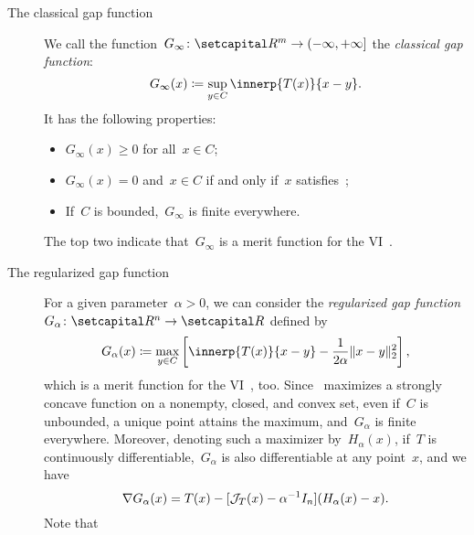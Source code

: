 \documentclass[../../main]{subfiles}
\begin{document}
\begin{example} 
    \begin{description}
        \item[The classical gap function~\cite{Auslender1976,Hearn1982}]
            We call the function~$G_\infty \colon \setR^m \to (-\infty, +\infty]$ the \emph{classical gap function}:
            \begin{equation} \label{eq:gap}
                G_\infty(x) \coloneqq \sup_{y \in C} \innerp{T(x)}{x - y}
                .\end{equation}
            It has the following properties:
            \begin{itemize}
                \item $G_\infty(x) \ge 0$ for all~$x \in C$;
                \item $G_\infty(x) = 0$ and~$x \in C$ if and only if~$x$ satisfies~;
                \item If~$C$ is bounded,~$G_\infty$ is finite everywhere.
            \end{itemize}
            The top two indicate that~$G_\infty$ is a merit function for the VI~.
        \item[The regularized gap function~\cite{Fukushima1992,Auchmuty1989}]
            For a given parameter~$\alpha > 0$, we can consider the \emph{regularized gap function}~$G_\alpha \colon \setR^n \to \setR$ defined by
            \begin{equation} \label{eq:reg_gap}
                G_\alpha(x) \coloneqq \max_{y \in C} \left[ \innerp{T(x)}{x - y} - \frac{1}{2 \alpha} \norm{x - y}_2^2 \right]
                ,\end{equation}
            which is a merit function for the VI~, too.
            Since~ maximizes a strongly concave function on a nonempty, closed, and convex set, even if~$C$ is unbounded, a unique point attains the maximum, and~$G_\alpha$ is finite everywhere.
            Moreover, denoting such a maximizer by~$H_\alpha(x)$, if~$T$ is continuously differentiable,~$G_\alpha$ is also differentiable at any point~$x$, and we have
            \begin{equation}
                \nabla G_\alpha(x) = T(x) - [ \mathcal{J}_{T}(x) - \alpha^{-1} I_n ] (H_\alpha(x) - x)
                .\end{equation}
            Note that
            \begin{equation}

\end{equation}
\end{description}
\end{example}
\end{document}
